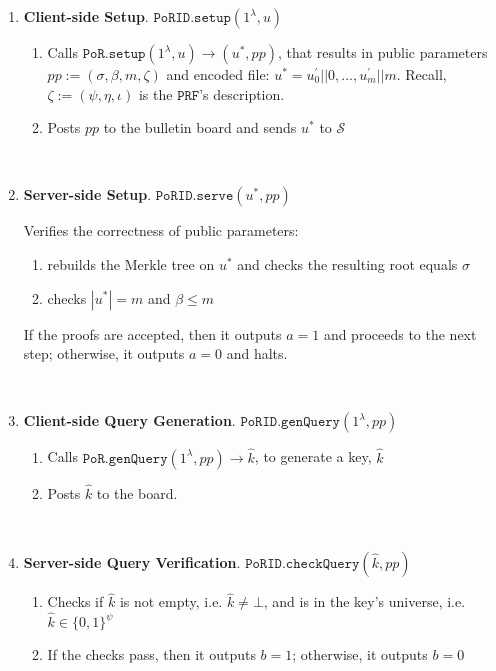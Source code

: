 \begin{enumerate}
   
\item\textbf{Client-side Setup}. $\mathtt{PoRID.setup}(1^{\lambda}, u)$
\begin{enumerate}
\item Calls  $\mathtt{PoR.setup}(1^{\lambda}, u)\rightarrow (u^{\scriptscriptstyle *},pp)$, that results in public parameters $pp:=(\sigma,\beta,m,\zeta)$ and encoded file: $u^{\scriptscriptstyle *}=u^{\scriptscriptstyle '}_{\scriptscriptstyle 0}||0,...,u^{\scriptscriptstyle '}_{\scriptscriptstyle m}||m$. Recall,  $\zeta:=(\psi,\eta, \iota)$ is the $\mathtt{PRF}$'s description.

\item Posts $pp$ to the bulletin board and sends $u^{\scriptscriptstyle *}$ to $\mathcal{S}$ 
\end{enumerate}

\

\item\textbf{Server-side Setup}. $\mathtt{PoRID.serve}(u^{\scriptscriptstyle *},pp)$

Verifies the correctness of public parameters:
\begin{enumerate}
\item rebuilds  the Merkle tree on $u^{\scriptscriptstyle *}$ and checks the resulting root equals $\sigma$
\item checks $|u^{*}|=m$ and  $\beta\leq m$
\end{enumerate}
 If the proofs are accepted, then  it outputs $a = 1$ and proceeds to the next step; otherwise, it outputs $a = 0$ and halts.
 
 


\

\item\textbf{Client-side Query Generation}. $\mathtt{PoRID.genQuery}(1^{\lambda},  pp)$ 
\begin{enumerate}
\item Calls $\mathtt{PoR.genQuery}(1^{\lambda}, pp)\rightarrow \hat{k}$, to generate a key, $\hat{k}$ %
\item Posts $\hat{k}$ to the board. 
\end{enumerate}


\

\item\textbf{Server-side Query Verification}. $\mathtt{PoRID.checkQuery}(\hat{k}, pp)$
\begin{enumerate}
\item  Checks if  $\hat{k}$ is not empty, i.e. $\hat{k}\neq \bot$, and is in the key's universe, i.e. $\hat{k}\in \{0,1\}^{\scriptscriptstyle\psi}$%
\item  If the checks pass, then it outputs $b=1$; otherwise, it outputs $b=0$



\end{enumerate}
\end{enumerate}
